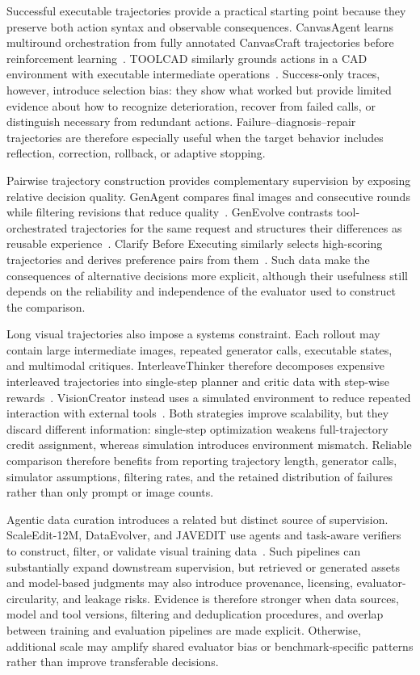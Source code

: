 Successful executable trajectories provide a practical starting point because they preserve both action syntax and observable consequences. CanvasAgent learns multiround orchestration from fully annotated CanvasCraft trajectories before reinforcement learning~\cite{avg260705465}. TOOLCAD similarly grounds actions in a CAD environment with executable intermediate operations~\cite{gong2026toolcad}. Success-only traces, however, introduce selection bias: they show what worked but provide limited evidence about how to recognize deterioration, recover from failed calls, or distinguish necessary from redundant actions. Failure--diagnosis--repair trajectories are therefore especially useful when the target behavior includes reflection, correction, rollback, or adaptive stopping.

Pairwise trajectory construction provides complementary supervision by exposing relative decision quality. GenAgent compares final images and consecutive rounds while filtering revisions that reduce quality~\cite{jiang2026genagent}. GenEvolve contrasts tool-orchestrated trajectories for the same request and structures their differences as reusable experience~\cite{chen2026genevolve}. Clarify Before Executing similarly selects high-scoring trajectories and derives preference pairs from them~\cite{avg260716352}. Such data make the consequences of alternative decisions more explicit, although their usefulness still depends on the reliability and independence of the evaluator used to construct the comparison.

Long visual trajectories also impose a systems constraint. Each rollout may contain large intermediate images, repeated generator calls, executable states, and multimodal critiques. InterleaveThinker therefore decomposes expensive interleaved trajectories into single-step planner and critic data with step-wise rewards~\cite{avg260613679}. VisionCreator instead uses a simulated environment to reduce repeated interaction with external tools~\cite{avg260302681}. Both strategies improve scalability, but they discard different information: single-step optimization weakens full-trajectory credit assignment, whereas simulation introduces environment mismatch. Reliable comparison therefore benefits from reporting trajectory length, generator calls, simulator assumptions, filtering rates, and the retained distribution of failures rather than only prompt or image counts.

Agentic data curation introduces a related but distinct source of supervision. ScaleEdit-12M, DataEvolver, and JAVEDIT use agents and task-aware verifiers to construct, filter, or validate visual training data~\cite{avg260320644,avg260603168,avg260631537}. Such pipelines can substantially expand downstream supervision, but retrieved or generated assets and model-based judgments may also introduce provenance, licensing, evaluator-circularity, and leakage risks. Evidence is therefore stronger when data sources, model and tool versions, filtering and deduplication procedures, and overlap between training and evaluation pipelines are made explicit. Otherwise, additional scale may amplify shared evaluator bias or benchmark-specific patterns rather than improve transferable decisions.

